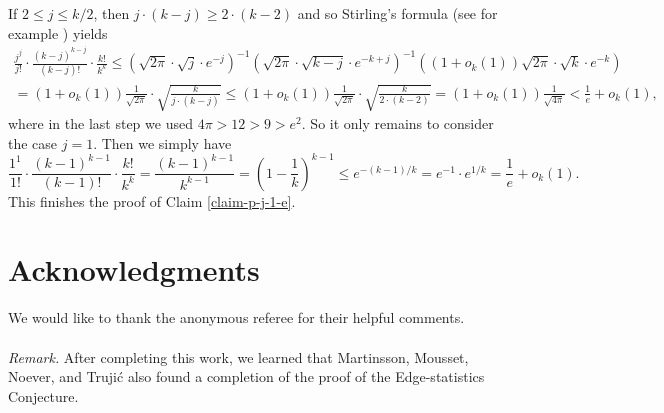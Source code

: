\documentclass[11pt]{article}
\theoremstyle{definition}
\numberwithin{equation}{section}
\begin{document}
If $2\leq j\leq k/2$, then $j\cdot (k-j)\geq 2\cdot (k-2)$ and so Stirling's formula (see for example \cite{robbins}) yields
\begin{multline*}
\frac{j^j}{j!}\cdot\frac{(k-j)^{k-j}}{(k-j)!}\cdot \frac{k!}{k^k}\leq \left(\sqrt{2\pi}\cdot \sqrt{j}\cdot e^{-j}\right)^{-1} \left(\sqrt{2\pi}\cdot \sqrt{k-j}\cdot e^{-k+j}\right)^{-1} \left((1+o_k(1))\sqrt{2\pi}\cdot \sqrt{k}\cdot e^{-k}\right)\\
=(1+o_k(1)) \frac{1}{\sqrt{2\pi}}\cdot \sqrt{\frac{k}{j\cdot (k-j)}}\leq (1+o_k(1)) \frac{1}{\sqrt{2\pi}}\cdot \sqrt{\frac{k}{2\cdot (k-2)}}=(1+o_k(1)) \frac{1}{\sqrt{4\pi}}< \frac{1}{e}+o_k(1),
\end{multline*}
where in the last step we used $4\pi>12>9>e^2$. So it only remains to consider the case $j=1$. Then we simply have
\[\frac{1^1}{1!}\cdot\frac{(k-1)^{k-1}}{(k-1)!}\cdot \frac{k!}{k^k}=\frac{(k-1)^{k-1}}{k^{k-1}}=\left(1-\frac{1}{k}\right)^{k-1}\leq e^{-(k-1)/k}=e^{-1}\cdot e^{1/k}=\frac{1}{e}+o_k(1).\]
This finishes the proof of Claim \ref{claim-p-j-1-e}.

\section*{Acknowledgments} %
We would like to thank the anonymous referee for their helpful comments.
\\
\\
\noindent\textit{Remark.} After completing this work, we learned that Martinsson, Mousset, Noever, and Truji\'c \cite{martinsson-et-al}  also found a completion of the proof of the Edge-statistics Conjecture.
\end{document}
